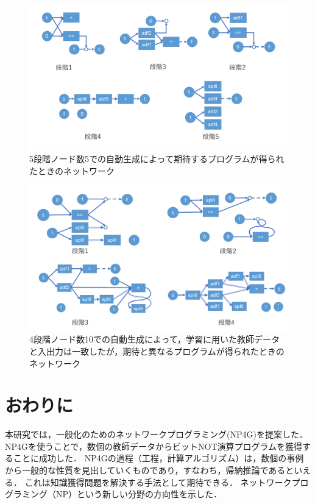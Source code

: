 \documentclass[exploratorypaper]{jsaiart} %
\begin{document}
\begin{figure}[t]
    \begin{center}
        \includegraphics[width=150mm]{out_net_p5n5.png}
    \end{center}
    \capwidth=90mm %
    \caption{5段階ノード数5での自動生成によって期待するプログラムが得られたときのネットワーク}
    \label{fig:out_net_p5n5}
\end{figure}

\begin{figure}[t]
    \begin{center}
        \includegraphics[width=150mm]{out_net_p4n10.png}
    \end{center}
    \capwidth=90mm %
    \caption{4段階ノード数10での自動生成によって，学習に用いた教師データと入出力は一致したが，期待と異なるプログラムが得られたときのネットワーク}
    \label{fig:out_net_p4n10}
\end{figure}

\section{おわりに}
本研究では，一般化のためのネットワークプログラミング(NP4G)を提案した．NP4Gを使うことで，数個の教師データからビットNOT演算プログラムを獲得することに成功した．
NP4Gの過程（工程，計算アルゴリズム）は，数個の事例から一般的な性質を見出していくものであり，すなわち，帰納推論であるといえる．
これは知識獲得問題を解決する手法として期待できる．
ネットワークプログラミング（NP）という新しい分野の方向性を示した．
\end{document}
